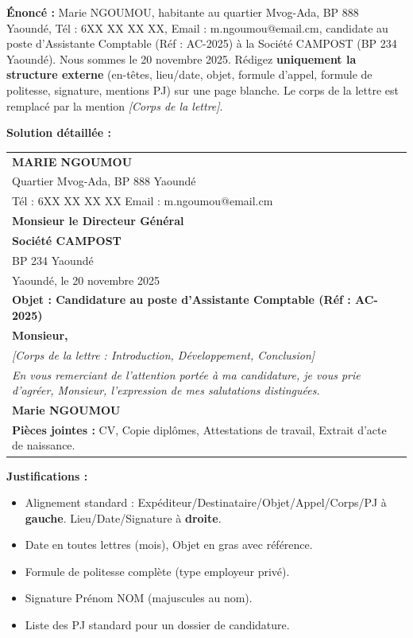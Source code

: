 \documentclass[11pt]{article}
\begin{document}
\begin{exoresolu}
    \textbf{Énoncé :} Marie NGOUMOU, habitante au quartier Mvog-Ada, BP 888 Yaoundé, Tél : 6XX XX XX XX, Email : m.ngoumou@email.cm, candidate au poste d'Assistante Comptable (Réf : AC-2025) à la Société CAMPOST (BP 234 Yaoundé). Nous sommes le 20 novembre 2025. Rédigez \textbf{uniquement la structure externe} (en-têtes, lieu/date, objet, formule d'appel, formule de politesse, signature, mentions PJ) sur une page blanche. Le corps de la lettre est remplacé par la mention \textit{[Corps de la lettre]}.

    \tcblower
    \textbf{Solution détaillée :}
    \begin{center}
    \begin{tabularx}{\linewidth}{|X|}\hline
    \textbf{MARIE NGOUMOU} \\
    Quartier Mvog-Ada, BP 888 Yaoundé \\
    Tél : 6XX XX XX XX \quad Email : m.ngoumou@email.cm \\ \hline
    \textbf{Monsieur le Directeur Général} \\
    \textbf{Société CAMPOST} \\
    BP 234 Yaoundé \\ \hline
    \hfill Yaoundé, le 20 novembre 2025 \\ \hline
    \textbf{Objet : Candidature au poste d'Assistante Comptable (Réf : AC-2025)} \\ \hline
    \textbf{Monsieur,} \\ \hline
    \textit{[Corps de la lettre : Introduction, Développement, Conclusion]} \\ \hline
    \textit{En vous remerciant de l'attention portée à ma candidature, je vous prie d'agréer, Monsieur, l'expression de mes salutations distinguées.} \\ \hline
    \hfill \textbf{Marie NGOUMOU} \\ \hline
    \textbf{Pièces jointes :} CV, Copie diplômes, Attestations de travail, Extrait d'acte de naissance. \\ \hline
    \end{tabularx}
    \end{center}
    \textbf{Justifications :}
    \begin{itemize}
        \item Alignement standard : Expéditeur/Destinataire/Objet/Appel/Corps/PJ à \textbf{gauche}. Lieu/Date/Signature à \textbf{droite}.
        \item Date en toutes lettres (mois), Objet en gras avec référence.
        \item Formule de politesse complète (type employeur privé).
        \item Signature Prénom NOM (majuscules au nom).
        \item Liste des PJ standard pour un dossier de candidature.
    \end{itemize}
\end{exoresolu}
\end{document}
